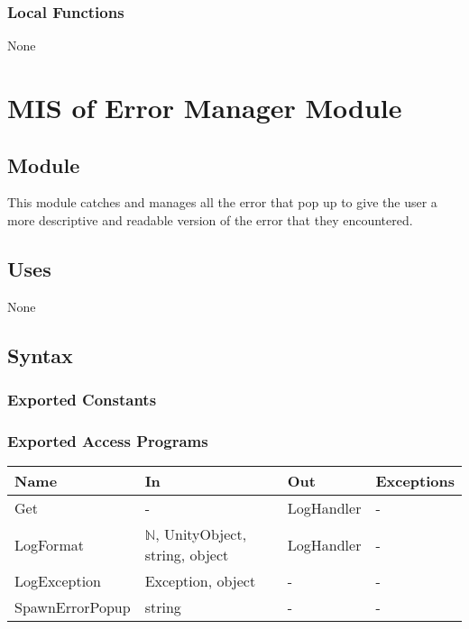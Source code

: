 \documentclass[12pt, titlepage]{article}
\begin{document}
\subsubsection{Local Functions}

None

\newpage


\section{MIS of {Error Manager Module}} \label{ErrorModule} 

\subsection{Module}

This module catches and manages all the error that pop up to give the user a more descriptive and readable version of the error that they encountered.

\subsection{Uses}

None

\subsection{Syntax}

\subsubsection{Exported Constants}

\subsubsection{Exported Access Programs}

\begin{center}
\begin{tabular}{p{3.2cm} p{4cm} p{4cm} p{2cm}}
\hline
\textbf{Name} & \textbf{In} & \textbf{Out} & \textbf{Exceptions} \\
\hline
Get & - & LogHandler & - \\
LogFormat & $\mathds{N}$, UnityObject, string, object & LogHandler & - \\
LogException & Exception, object & - &-\\
SpawnErrorPopup & string & - & - \\
\hline
\end{tabular}
\end{center}
\end{document}
